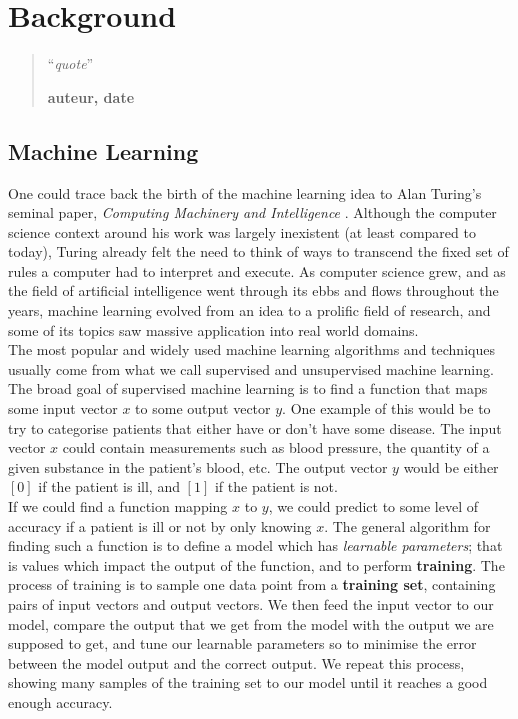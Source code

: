 \chapter{Background}
\begin{quotation}
\noindent ``\emph{quote}''
\begin{flushright}\textbf{auteur, date}\end{flushright}
\end{quotation}

\vspace*{0.5cm}

\section{Machine Learning}
One could trace back the birth of the machine learning idea to Alan Turing's 
seminal paper, \textit{Computing Machinery and Intelligence} 
\cite{turing1950computing}. Although the computer science context around his
work was largely inexistent (at least compared to today), Turing already felt
the need to think of ways to transcend the fixed set of rules a computer had
to interpret and execute. As computer science grew, and as the field of
artificial intelligence went through its ebbs and flows throughout the years,
machine learning evolved from an idea to a prolific field of research, and
some of its topics saw massive application into real world domains.\\

The most popular and widely used machine learning algorithms and techniques
usually come from what we call supervised and unsupervised machine learning.
The broad goal of supervised machine learning is to find a function that maps
some input vector $x$ to some output vector $y$. One example of this would be
to try to categorise patients that either have or don't have some disease. 
The input vector $x$ could contain measurements such as blood pressure, the 
quantity of a given substance in the patient's blood, etc. The output vector
$y$ would be either $[0]$ if the patient is ill, and $[1]$ if the patient is
not.\\

If we could find a function mapping $x$ to $y$, we could predict to some
level of accuracy if a patient is ill or not by only knowing $x$. The general
algorithm for finding such a function is to define a model which has
\textit{learnable parameters}; that is values which impact the output of the
function, and to perform \textbf{training}. The process of training is to
sample one data point from a \textbf{training set}, containing pairs of input
vectors and output vectors. We then feed the input vector to our model, compare
the output that we get from the model with the output we are supposed to get,
and tune our learnable parameters so to minimise the error between the model
output and the correct output. We repeat this process, showing many samples
of the training set to our model until it reaches a good enough accuracy.

